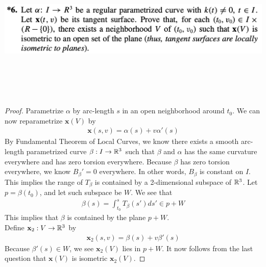 \documentclass{report}
\begin{document}
\begin{question}{}{}
\includegraphics[height=7cm,width=18cm]{hw63}
\end{question}
\begin{proof}
Parametrize $\alpha $ by arc-length $s$ in an open neighborhood around $t_0$. We can now reparametrize $\textbf{x}(V)$ by 
\begin{align*}
\textbf{x}(s,v)=\alpha (s)+ v\alpha '(s)
\end{align*}
By Fundamental Theorem of Local Curves, we know there exists a smooth arc-length parametrized curve $\beta :I\rightarrow \mathbb{R}^3$ such that $\beta $ and $\alpha $ has the same curvature everywhere and has zero torsion everywhere. Because $\beta $ has zero torsion everywhere, we know $B_{\beta }'=0$ everywhere. In other words,  $B_\beta $ is constant on $I$. This implies  the range of $T_\beta $ is contained by a 2-dimensional subspace of $\mathbb{R}^3$. Let  $p=\beta (t_0)$, and let such subspace be $W$. We see that 
\begin{align*}
\beta (s)= \int_{t_0}^s T_{\beta }(s')ds' \in p+W
\end{align*}
This implies that $\beta $ is contained by the plane $p+W$.\\

Define $\textbf{x}_2:V\rightarrow \mathbb{R}^3$ by
\begin{align*}
\textbf{x}_2(s,v)=\beta (s)+ v \beta '(s)
\end{align*}
Because $\beta '(s)\in W$, we see $\textbf{x}_2(V)$ lies in $p+W$. It now follows from the last question that  $\textbf{x}(V)$ is isometric $\textbf{x}_2(V)$. 
\end{proof}
\end{document}
